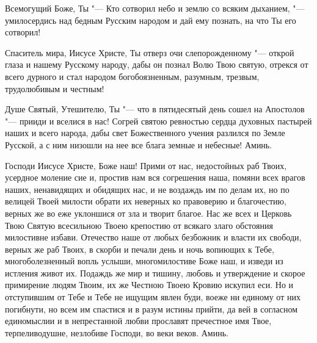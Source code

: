 \bigskip\bigskip\mychapterending

 


Всемогущий Боже, Ты "--- Кто сотворил небо и землю со всяким дыханием, "--- умилосердись над бедным Русским народом и дай ему познать, на что Ты его сотворил! 

Спаситель мира, Иисусе Христе, Ты отверз очи слепорожденному "--- открой глаза и нашему Русскому народу, дабы он познал Волю Твою святую, отрекся от всего дурного и стал народом богобоязненным, разумным, трезвым, трудолюбивым и честным! 

Душе Святый, Утешителю, Ты "--- что в пятидесятый день сошел на Апостолов "--- прииди и вселися в нас! Согрей святою ревностью сердца духовных пастырей наших и всего народа, дабы свет Божественного учения разлился по Земле Русской, а с ним низошли на нее все блага земные и небесные! Аминь. 


\bigskip\bigskip\mychapterending

 


Господи Иисусе Христе, Боже наш! Прими от нас, недостойных раб Твоих, усердное моление сие и, простив нам вся согрешения наша, помяни всех врагов наших, ненавидящих и обидящих нас, и не воздаждь им по делам их, но по велицей Твоей милости обрати их неверных ко правоверию и благочестию, верных же во еже уклоншися от зла и творит благое. Нас же всех и Церковь Твою Святую всесильною Твоею крепостию от всякаго злаго обстояния милостивне избави. Отечество наше от любых безбожник и власти их свободи, верных же раб Твоих, в скорби и печали день и ночь вопиющих к Тебе, многоболезненный вопль услыши, многомилостиве Боже наш, и изведи из истления живот их. Подаждь же мир и тишину, любовь и утверждение и скорое примирение людям Твоим, их же Честною Твоею Кровию искупил еси. Но и отступившим от Тебе и Тебе не ищущим явлен буди, воеже ни единому от них погибнути, но всем им спастися и в разум истины прийти, да вей в согласном единомыслии и в непрестанной любви прославят пречестное имя Твое, терпеливодушне, незлобиве Господи, во веки веков. Аминь. 





\bigskip\bigskip\mychapterending

 


